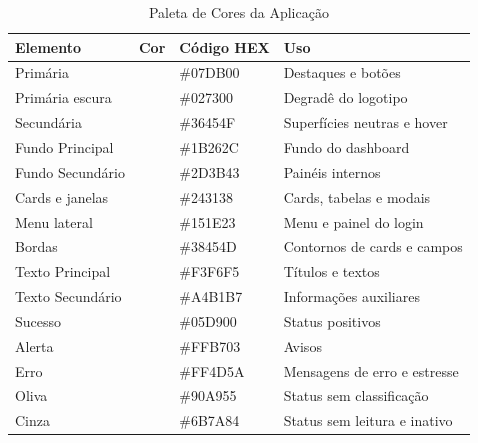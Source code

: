 \documentclass[11pt,a4paper]{article}
\begin{document}
\begin{table}[H]
\centering
\caption{Paleta de Cores da Aplicação}
\label{tab:cores}

\begin{tabular}{|l|c|l|p{5cm}|}
\hline
\textbf{Elemento} & \textbf{Cor} & \textbf{Código HEX} & \textbf{Uso} \\
\hline

Primária & \colorbox[HTML]{07DB00}{\phantom{AAA}} & \#07DB00 & Destaques e botões \\

Primária escura & \colorbox[HTML]{027300}{\phantom{AAA}} & \#027300 & Degradê do logotipo \\

Secundária & \colorbox[HTML]{36454F}{\phantom{AAA}} & \#36454F & Superfícies neutras e hover \\

Fundo Principal & \colorbox[HTML]{1B262C}{\phantom{AAA}} & \#1B262C & Fundo do dashboard \\

Fundo Secundário & \colorbox[HTML]{2D3B43}{\phantom{AAA}} & \#2D3B43 & Painéis internos \\

Cards e janelas & \colorbox[HTML]{243138}{\phantom{AAA}} & \#243138 & Cards, tabelas e modais \\

Menu lateral & \colorbox[HTML]{151E23}{\phantom{AAA}} & \#151E23 & Menu e painel do login \\

Bordas & \colorbox[HTML]{38454D}{\phantom{AAA}} & \#38454D & Contornos de cards e campos \\

Texto Principal & \colorbox[HTML]{F3F6F5}{\phantom{AAA}} & \#F3F6F5 & Títulos e textos \\

Texto Secundário & \colorbox[HTML]{A4B1B7}{\phantom{AAA}} & \#A4B1B7 & Informações auxiliares \\

Sucesso & \colorbox[HTML]{05D900}{\phantom{AAA}} & \#05D900 & Status positivos \\

Alerta & \colorbox[HTML]{FFB703}{\phantom{AAA}} & \#FFB703 & Avisos \\

Erro & \colorbox[HTML]{FF4D5A}{\phantom{AAA}} & \#FF4D5A & Mensagens de erro e estresse \\

Oliva & \colorbox[HTML]{90A955}{\phantom{AAA}} & \#90A955 & Status sem classificação \\

Cinza & \colorbox[HTML]{6B7A84}{\phantom{AAA}} & \#6B7A84 & Status sem leitura e inativo \\

\hline
\end{tabular}

\end{table}
\end{document}
